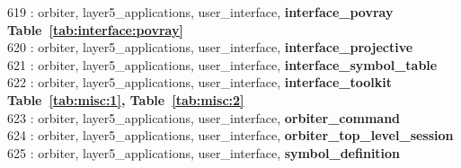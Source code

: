 619 : orbiter, layer5\_applications, user\_interface, {\bf interface\_povray Table~\ref{tab:interface:povray}}\\
620 : orbiter, layer5\_applications, user\_interface, {\bf interface\_projective}\\
621 : orbiter, layer5\_applications, user\_interface, {\bf interface\_symbol\_table}\\
622 : orbiter, layer5\_applications, user\_interface, {\bf interface\_toolkit Table~\ref{tab:misc:1},  Table~\ref{tab:misc:2}}\\
623 : orbiter, layer5\_applications, user\_interface, {\bf orbiter\_command}\\
624 : orbiter, layer5\_applications, user\_interface, {\bf orbiter\_top\_level\_session}\\
625 : orbiter, layer5\_applications, user\_interface, {\bf symbol\_definition}\\
